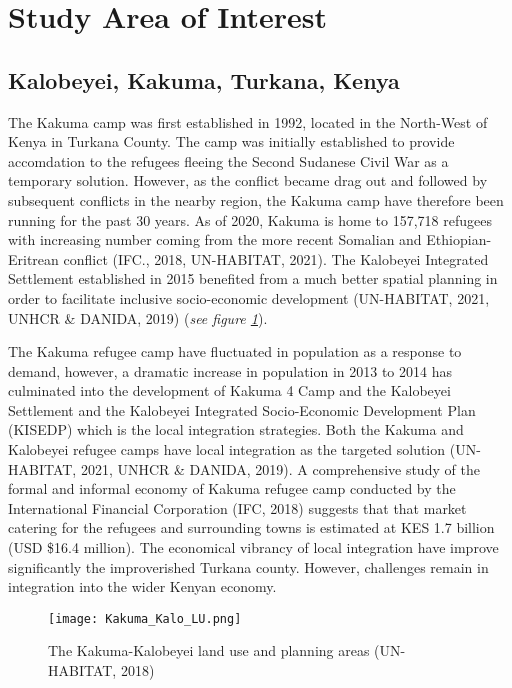 \documentclass[11pt, a4paper, twoside]{report}
\begin{document}
\section{Study Area of Interest}\label{StudyAOI}
\subsection{Kalobeyei, Kakuma, Turkana, Kenya}\label{Kalobeyei}

The Kakuma camp was first established in 1992, located in the North-West of Kenya in Turkana County. The camp was initially established to provide accomdation to the refugees fleeing the Second Sudanese Civil War as a temporary solution. However, as the conflict became drag out and followed by subsequent conflicts in the nearby region, the Kakuma camp have therefore been running for the past 30 years. As of 2020, Kakuma is home to 157,718 refugees with increasing number coming from the more recent Somalian and Ethiopian-Eritrean conflict (IFC., 2018, UN-HABITAT, 2021). The Kalobeyei Integrated Settlement established in 2015 benefited from a much better spatial planning in order to facilitate inclusive socio-economic development (UN-HABITAT, 2021, UNHCR \& DANIDA, 2019) (\textit{see figure \ref{fig:KU_KALO_LU}}).\\\par

The Kakuma refugee camp have fluctuated in population as a response to demand, however, a dramatic increase in population in 2013 to 2014 has culminated into the development of Kakuma 4 Camp and the Kalobeyei Settlement and the Kalobeyei Integrated Socio-Economic Development Plan (KISEDP) which is the local integration strategies. Both the Kakuma and Kalobeyei refugee camps have local integration as the targeted solution (UN-HABITAT, 2021, UNHCR \& DANIDA, 2019). A comprehensive study of the formal and informal economy of Kakuma refugee camp conducted by the International Financial Corporation (IFC, 2018) suggests that that market catering for the refugees and surrounding towns is estimated at KES 1.7 billion (USD \$16.4 million). The economical vibrancy of local integration have improve significantly the improverished Turkana county. However, challenges remain in integration into the wider Kenyan economy.\\\par

\begin{figure}[H]
  \centering
  \texttt{[image: Kakuma\_Kalo\_LU.png]}
  \caption{The Kakuma-Kalobeyei land use and planning areas (UN-HABITAT, 2018)}
  \label{fig:KU_KALO_LU}
\end{figure}
\end{document}
